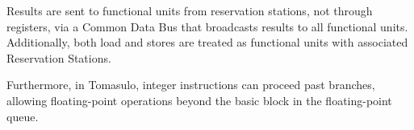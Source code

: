 Results are sent to functional units from reservation stations, not through registers, via a Common Data Bus that broadcasts results to all functional units. 
Additionally, both load and stores are treated as functional units with associated Reservation Stations.

Furthermore, in Tomasulo, integer instructions can proceed past branches, allowing floating-point operations beyond the basic block in the floating-point queue.